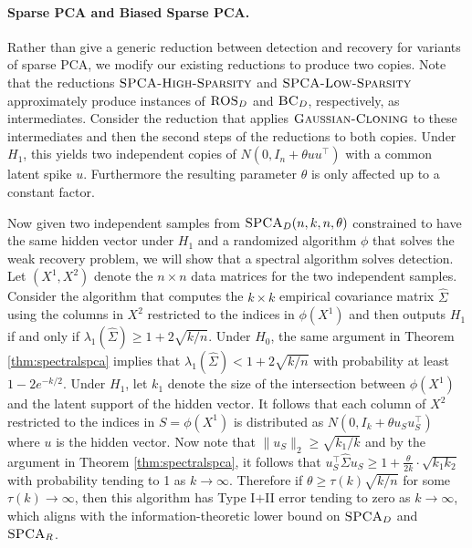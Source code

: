 \paragraph{Sparse PCA and Biased Sparse PCA.} Rather than give a generic reduction between detection and recovery for variants of sparse PCA, we modify our existing reductions to produce two copies. Note that the reductions $\textsc{SPCA-High-Sparsity}$ and $\textsc{SPCA-Low-Sparsity}$ approximately produce instances of $\textsc{ROS}_D$ and $\textsc{BC}_D$, respectively, as intermediates. Consider the reduction that applies $\textsc{Gaussian-Cloning}$ to these intermediates and then the second steps of the reductions to both copies. Under $H_1$, this yields two independent copies of $N\left(0, I_n + \theta uu^\top \right)$ with a common latent spike $u$. Furthermore the resulting parameter $\theta$ is only affected up to a constant factor.

Now given two independent samples from $\textsc{SPCA}_D(n, k, n, \theta)$ constrained to have the same hidden vector under $H_1$ and a randomized algorithm $\phi$ that solves the weak recovery problem, we will show that a spectral algorithm solves detection. Let $(X^1, X^2)$ denote the $n \times n$ data matrices for the two independent samples. Consider the algorithm that computes the $k \times k$ empirical covariance matrix $\hat{\Sigma}$ using the columns in $X^2$ restricted to the indices in $\phi(X^1)$ and then outputs $H_1$ if and only if $\lambda_1(\hat{\Sigma}) \ge 1 + 2 \sqrt{k/n}$. Under $H_0$, the same argument in Theorem \ref{thm:spectralspca} implies that $\lambda_1(\hat{\Sigma}) < 1 + 2 \sqrt{k/n}$ with probability at least $1 - 2e^{-k/2}$. Under $H_1$, let $k_1$ denote the size of the intersection between $\phi(X^1)$ and the latent support of the hidden vector. It follows that each column of $X^2$ restricted to the indices in $S = \phi(X^1)$ is distributed as $N\left(0, I_k + \theta u_S u_S^\top \right)$ where $u$ is the hidden vector. Now note that $\| u_S \|_2 \ge \sqrt{k_1/k}$ and by the argument in Theorem \ref{thm:spectralspca}, it follows that $u_S^\top \hat{\Sigma} u_S \ge 1 + \frac{\theta}{2k} \cdot \sqrt{k_1 k_2}$ with probability tending to 1 as $k \to \infty$. Therefore if $\theta \ge \tau(k) \sqrt{k/n}$ for some $\tau(k) \to \infty$, then this algorithm has Type I$+$II error tending to zero as $k \to \infty$, which aligns with the information-theoretic lower bound on $\textsc{SPCA}_D$ and $\textsc{SPCA}_R$.

